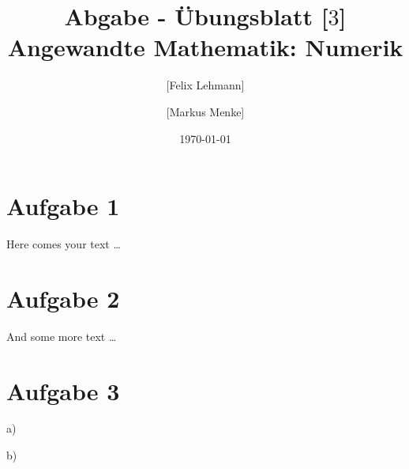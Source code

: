 \documentclass[10pt,a4paper]{article}
\begin{document}
\title{Abgabe - Übungsblatt [$3$]\\
\small{Angewandte Mathematik: Numerik}}
\author{ [Felix Lehmann] \and [Markus Menke]}
\date{\today}
\maketitle

\section*{Aufgabe 1}
Here comes your text \ldots

\section*{Aufgabe 2}
And some more text \ldots

\section*{Aufgabe 3}
a)

b)

\end{document}
